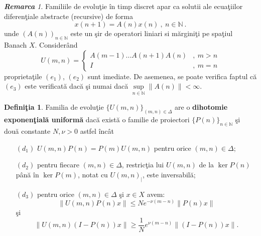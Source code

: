 \documentclass[ a4paper, 12pt]{report}
\newcommand{\N}{\mathbb{N}}
\newcommand{\defnemph}[1]{\textbf{#1}}
\theoremstyle{definition}
\newtheorem{definition}{\bf Defini\c tia}[section]
\theoremstyle{remark}
\newtheorem{remarc}{\bf Remarca}[section]
\numberwithin{equation}{section}
\begin{document}
\begin{remarc}
Familiile de evolu\c tie \^in timp discret apar ca solutii ale ecua\c tiilor diferen\c tiale abstracte (recursive) de forma
\begin{equation}
\label{differenceeq}
x(n+1) = A(n) x(n)\ ,\ n\in\N\ .
\end{equation}
unde $(A(n))_{n\in\N}$ este un \c sir de operatori liniari si m\u argini\c ti pe spa\c tiul Banach $X$.
Consider\^and
$$U(m,n)=
\begin{cases}
A(m-1)...A(n+1)A(n) &,\ m>n\\
I &,\ m=n
\end{cases}
 $$
proprieta\c tile $(e_1)$, $(e_2)$ sunt imediate.
De asemenea, se poate verifica faptul c\u a $(e_3)$ este verificat\u a dac\u a \c si numai dac\u a
$\sup\limits_{n\in\N}\|A(n)\| <\infty$.
\end{remarc}


\begin{definition}
\label{expdichot}
Familia de evolu\c tie $\{U(m,n)\}_{(m,n)\in\Delta}$ are o \defnemph{dihotomie exponen\c tial\u a uniform\u a} dac\u a
exist\u a o familie de proiectori $\{P(n)\}_{n\in\N}$ \c si dou\u a constante $N,\nu>0$ astfel \^inc\^at
\begin{enumerate}
\item[$(d_1)$] $U(m,n)P(n)=P(m)U(m,n)$ pentru orice $(m,n)\in\Delta$;
\item[$(d_2)$] pentru fiecare $(m,n)\in\Delta$, restric\c tia lui
    $U(m,n)$ de la $\ker P(n)$ p\^an\u a \^in $\ker P(m)$, notat cu
    $U(m,n)_{|}$, este inversabil\u a;
\item[$(d_3)$] pentru orice $(m,n)\in\Delta$ \c si $x\in X$ avem:
$$\|U(m,n)P(n)x\|\leq Ne^{-\nu(m-n)}\|P(n)x\|$$ \c si $$\|U(m,n)(I-P(n))x\|\geq  \frac{1}{N}e^{\nu(m-n)}\|(I-P(n))x\|.$$
\end{enumerate}
\end{definition}
\end{document}
